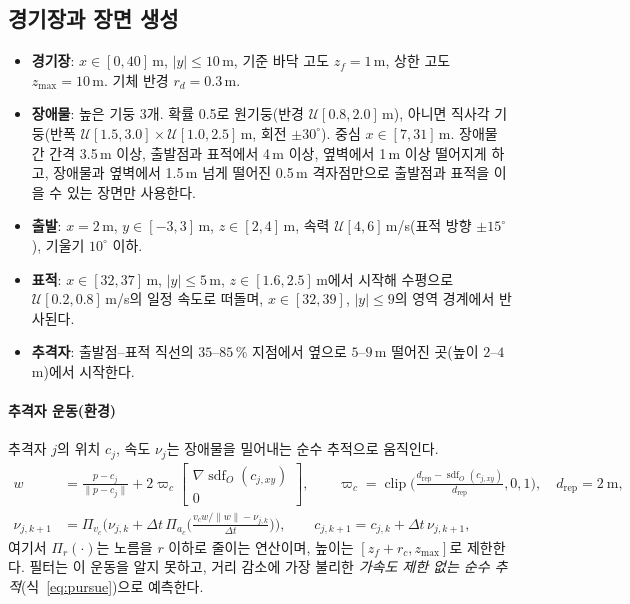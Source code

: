 \documentclass[10pt,a4paper]{article}
\newcommand{\clip}{\operatorname{clip}}
\newcommand{\sdf}{\operatorname{sdf}}
\begin{document}
\subsection{경기장과 장면 생성}\label{sec:arena}
\begin{itemize}
\item \textbf{경기장}: $x\in[0,40]$\,m, $|y|\le10$\,m, 기준 바닥 고도 $z_f=1$\,m, 상한 고도 $z_{\max}=10$\,m. 기체 반경 $r_d=0.3$\,m.
\item \textbf{장애물}: 높은 기둥 3개. 확률 0.5로 원기둥(반경 $\mathcal U[0.8,2.0]$\,m), 아니면 직사각 기둥(반폭 $\mathcal U[1.5,3.0]\times\mathcal U[1.0,2.5]$\,m, 회전 $\pm30^\circ$). 중심 $x\in[7,31]$\,m.
  장애물 간 간격 3.5\,m 이상, 출발점과 표적에서 4\,m 이상, 옆벽에서 1\,m 이상 떨어지게 하고, 장애물과 옆벽에서 1.5\,m 넘게 떨어진 0.5\,m 격자점만으로 출발점과 표적을 이을 수 있는 장면만 사용한다.
\item \textbf{출발}: $x=2$\,m, $y\in[-3,3]$\,m, $z\in[2,4]$\,m, 속력 $\mathcal U[4,6]$\,m/s(표적 방향 $\pm15^\circ$), 기울기 $10^\circ$ 이하.
\item \textbf{표적}: $x\in[32,37]$\,m, $|y|\le5$\,m, $z\in[1.6,2.5]$\,m에서 시작해 수평으로 $\mathcal U[0.2,0.8]$\,m/s의 일정 속도로 떠돌며, $x\in[32,39]$, $|y|\le9$의 영역 경계에서 반사된다.
\item \textbf{추격자}: 출발점--표적 직선의 $35$--$85\,\%$ 지점에서 옆으로 $5$--$9$\,m 떨어진 곳(높이 $2$--$4$\,m)에서 시작한다.
\end{itemize}

\paragraph{추격자 운동(환경)} 추격자 $j$의 위치 $c_j$, 속도 $\nu_j$는 장애물을 밀어내는 순수 추적으로 움직인다.
\begin{align}
w&=\frac{p-c_j}{\|p-c_j\|}+2\varpi_c\begin{bmatrix}\nabla\sdf_O(c_{j,xy})\\0\end{bmatrix},\qquad
\varpi_c=\clip\!\Big(\frac{d_{\mathrm{rep}}-\sdf_O(c_{j,xy})}{d_{\mathrm{rep}}},0,1\Big),\quad d_{\mathrm{rep}}=2\ \mathrm m,\\
\nu_{j,k+1}&=\Pi_{v_c}\!\Big(\nu_{j,k}+\Delta t\,\Pi_{a_c}\big(\tfrac{v_c w/\|w\|-\nu_{j,k}}{\Delta t}\big)\Big),\qquad c_{j,k+1}=c_{j,k}+\Delta t\,\nu_{j,k+1},
\end{align}
여기서 $\Pi_r(\cdot)$는 노름을 $r$ 이하로 줄이는 연산이며, 높이는 $[z_f+r_c,z_{\max}]$로 제한한다.
필터는 이 운동을 알지 못하고, 거리 감소에 가장 불리한 \emph{가속도 제한 없는 순수 추적}(식~\eqref{eq:pursue})으로 예측한다.
\end{document}
